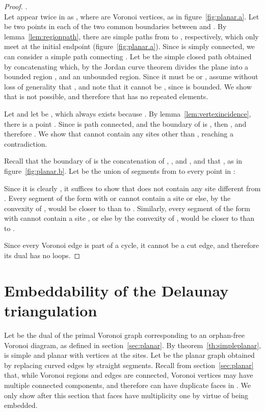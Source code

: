 \documentclass[11pt]{article}
\begin{document}
\begin{proof}
\vspace*{0.05in}. \\
Let  appear twice in  as , 
where  are Voronoi vertices, as in figure~\ref{fig:planar.a}. 
Let  be two points in each of the two common boundaries between  and . 
By lemma~\ref{lem:regionpath}, there are simple paths  from  to , respectively, 
	which only meet at the initial endpoint (figure~\ref{fig:planar.a}). 
Since  is simply connected, we can consider a simple path  connecting . 
Let  be the simple closed path obtained by concatenating  
	which, by the Jordan curve theorem divides the plane into a bounded region , and an unbounded region. 
Since it must be  or , 
	assume without loss of generality that , and note that it cannot be , 
	since  is bounded. 
We show that  is not possible, 
	and therefore that  has no repeated elements.

Let  and let  be , which always exists because . 
By lemma~\ref{lem:vertexincidence}, there is a point . 
Since  is path connected, and the boundary of  is , then , 
	and therefore . 
We show that  cannot contain any sites other than , reaching a contradiction.  

Recall that the boundary  of  is the concatenation of 
	, , and , 
	and that , as in figure~\ref{fig:planar.b}. 
Let  be the union of segments from  to every point in :

Since it is clearly , it suffices to show that  does not contain any site  different from .
Every segment of the form  
	with  or  cannot contain a site  
	or else, by the convexity of ,  would be closer to  than to . 
Similarly, every segment of the form  with 
	 cannot contain a site , or else by the convexity of ,  would be closer to  than to . 
	

Since every Voronoi edge  is part of a cycle, it cannot be a cut edge, and therefore its dual has no loops. 
\end{proof}









\section{Embeddability of the Delaunay triangulation}\label{sec:dual}





Let  be the dual of the primal Voronoi graph corresponding to an orphan-free Voronoi diagram, 
	as defined in section~\ref{sec:planar}. 
By theorem~\ref{th:simpleplanar},  is simple and planar with vertices at the sites. 
Let  be the planar graph obtained by replacing curved edges by straight segments. 
Recall from section~\ref{sec:planar} that, 
	while Voronoi regions and edges are connected, Voronoi vertices may have multiple connected components, 
	and therefore  can have duplicate faces in . 
We only show after this section that faces have multiplicity one by virtue of  being embedded. 
\end{document}
